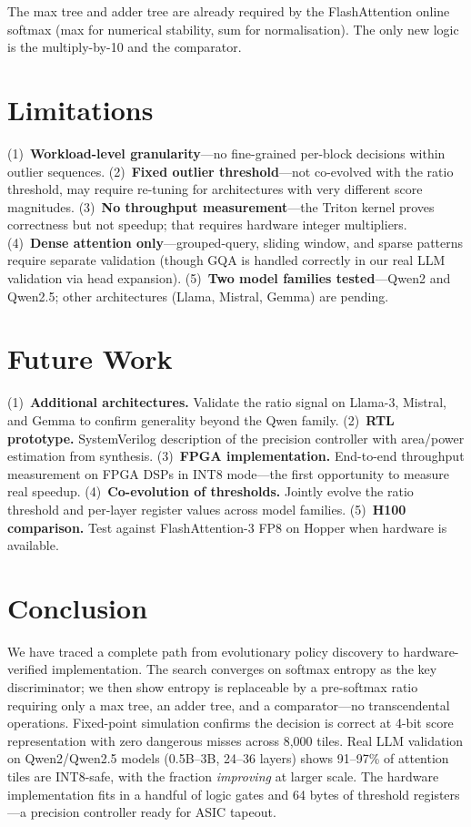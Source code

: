 \documentclass[10pt,twocolumn]{article}
\begin{document}
The max tree and adder tree are already required by the FlashAttention
online softmax (max for numerical stability, sum for normalisation).
The only new logic is the multiply-by-10 and the comparator.

\section{Limitations}

(1)~\textbf{Workload-level granularity}---no
fine-grained per-block decisions within outlier sequences.
(2)~\textbf{Fixed outlier threshold}---not co-evolved with the ratio
threshold, may require re-tuning for architectures with very different
score magnitudes.
(3)~\textbf{No throughput measurement}---the Triton kernel proves
correctness but not speedup; that requires hardware integer multipliers.
(4)~\textbf{Dense attention only}---grouped-query, sliding window, and
sparse patterns require separate validation (though GQA is handled
correctly in our real LLM validation via head expansion).
(5)~\textbf{Two model families tested}---Qwen2 and Qwen2.5;
other architectures (Llama, Mistral, Gemma) are pending.

\section{Future Work}

(1)~\textbf{Additional architectures.}
Validate the ratio signal on Llama-3, Mistral, and Gemma to confirm
generality beyond the Qwen family.
(2)~\textbf{RTL prototype.}
SystemVerilog description of the precision controller with
area/power estimation from synthesis.
(3)~\textbf{FPGA implementation.}
End-to-end throughput measurement on FPGA DSPs in INT8 mode---the
first opportunity to measure real speedup.
(4)~\textbf{Co-evolution of thresholds.}
Jointly evolve the ratio threshold and per-layer register values
across model families.
(5)~\textbf{H100 comparison.}
Test against FlashAttention-3 FP8 on Hopper when hardware is available.

\section{Conclusion}

We have traced a complete path from evolutionary policy discovery to
hardware-verified implementation. The search converges on softmax
entropy as the key discriminator; we then show entropy is replaceable
by a pre-softmax ratio requiring only a max tree, an adder tree, and
a comparator---no transcendental operations. Fixed-point simulation
confirms the decision is correct at 4-bit score representation with
zero dangerous misses across 8{,}000 tiles. Real LLM validation on
Qwen2/Qwen2.5 models (0.5B--3B, 24--36 layers) shows 91--97\% of
attention tiles are INT8-safe, with the fraction \emph{improving} at
larger scale. The hardware implementation fits in a handful of logic
gates and 64 bytes of threshold registers---a precision controller
ready for ASIC tapeout.



\end{document}

